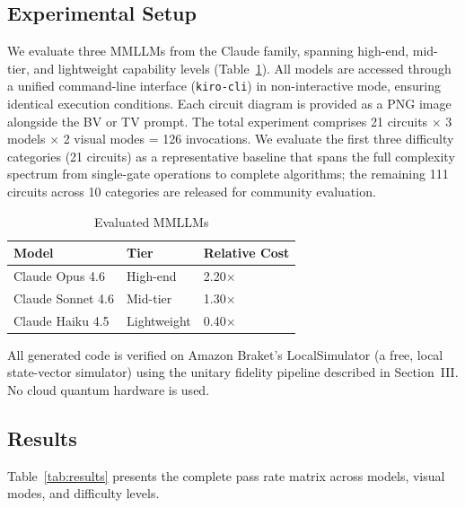 \documentclass[conference]{IEEEtran}
\begin{document}
\subsection{Experimental Setup}

We evaluate three MMLLMs from the Claude family, spanning high-end, mid-tier, and lightweight capability levels (Table~\ref{tab:models}). All models are accessed through a unified command-line interface (\texttt{kiro-cli}) in non-interactive mode, ensuring identical execution conditions. Each circuit diagram is provided as a PNG image alongside the BV or TV prompt. The total experiment comprises 21 circuits $\times$ 3 models $\times$ 2 visual modes = 126 invocations. We evaluate the first three difficulty categories (21 circuits) as a representative baseline that spans the full complexity spectrum from single-gate operations to complete algorithms; the remaining 111 circuits across 10 categories are released for community evaluation.

\begin{table}[t]
\centering
\caption{Evaluated MMLLMs}
\label{tab:models}
\small
\begin{tabular}{@{}lll@{}}
\toprule
Model & Tier & Relative Cost \\
\midrule
Claude Opus 4.6   & High-end    & 2.20$\times$ \\
Claude Sonnet 4.6 & Mid-tier    & 1.30$\times$ \\
Claude Haiku 4.5  & Lightweight & 0.40$\times$ \\
\bottomrule
\end{tabular}
\end{table}

All generated code is verified on Amazon Braket's LocalSimulator (a free, local state-vector simulator) using the unitary fidelity pipeline described in Section~III. No cloud quantum hardware is used.

\subsection{Results}

Table~\ref{tab:results} presents the complete pass rate matrix across models, visual modes, and difficulty levels.
\end{document}
